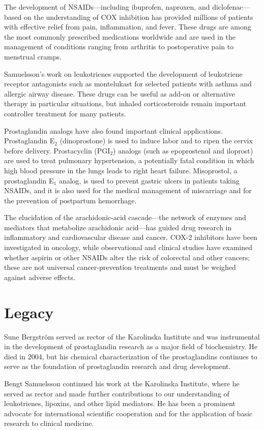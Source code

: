 The development of NSAIDs---including ibuprofen, naproxen, and diclofenac---based on the understanding of COX inhibition has provided millions of patients with effective relief from pain, inflammation, and fever. These drugs are among the most commonly prescribed medications worldwide and are used in the management of conditions ranging from arthritis to postoperative pain to menstrual cramps.

Samuelsson's work on leukotrienes supported the development of leukotriene receptor antagonists such as montelukast for selected patients with asthma and allergic airway disease. These drugs can be useful as add-on or alternative therapy in particular situations, but inhaled corticosteroids remain important controller treatment for many patients.

Prostaglandin analogs have also found important clinical applications. Prostaglandin E$_2$ (dinoprostone) is used to induce labor and to ripen the cervix before delivery. Prostacyclin (PGI$_2$) analogs (such as epoprostenol and iloprost) are used to treat pulmonary hypertension, a potentially fatal condition in which high blood pressure in the lungs leads to right heart failure. Misoprostol, a prostaglandin E$_1$ analog, is used to prevent gastric ulcers in patients taking NSAIDs, and it is also used for the medical management of miscarriage and for the prevention of postpartum hemorrhage.

The elucidation of the arachidonic-acid cascade---the network of enzymes and mediators that metabolize arachidonic acid---has guided drug research in inflammatory and cardiovascular disease and cancer. COX-2 inhibitors have been investigated in oncology, while observational and clinical studies have examined whether aspirin or other NSAIDs alter the risk of colorectal and other cancers; these are not universal cancer-prevention treatments and must be weighed against adverse effects.

\section{Legacy}

Sune Bergstr\"om served as rector of the Karolinska Institute and was instrumental in the development of prostaglandin research as a major field of biochemistry. He died in 2004, but his chemical characterization of the prostaglandins continues to serve as the foundation of prostaglandin research and drug development.

Bengt Samuelsson continued his work at the Karolinska Institute, where he served as rector and made further contributions to our understanding of leukotrienes, lipoxins, and other lipid mediators. He has been a prominent advocate for international scientific cooperation and for the application of basic research to clinical medicine.

